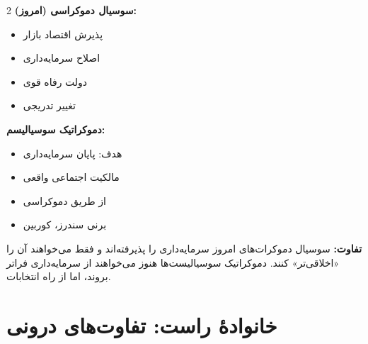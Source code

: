 \begin{tcolorbox}[
    enhanced,
    colback=centergreen!10,
    colframe=centergreen,
    boxrule=1.5pt,
    arc=5pt,
    fonttitle=\bfseries,
    title={\rl{🟢 سوسیال دموکراسی در برابر دموکراتیک سوسیالیسم}}
]
\begin{multicols}{2}
\textbf{سوسیال دموکراسی (امروز):}
\begin{itemize}
    \item پذیرش اقتصاد بازار
    \item اصلاح سرمایه‌داری
    \item دولت رفاه قوی
    \item تغییر تدریجی
\end{itemize}

\columnbreak

\textbf{دموکراتیک سوسیالیسم:}
\begin{itemize}
    \item هدف: پایان سرمایه‌داری
    \item مالکیت اجتماعی واقعی
    \item از طریق دموکراسی
    \item برنی سندرز، کوربین
\end{itemize}
\end{multicols}

\textbf{تفاوت:} سوسیال دموکرات‌های امروز سرمایه‌داری را پذیرفته‌اند و فقط می‌خواهند آن را «اخلاقی‌تر» کنند. دموکراتیک سوسیالیست‌ها هنوز می‌خواهند از سرمایه‌داری فراتر بروند، اما از راه انتخابات.
\end{tcolorbox}

\section*{خانوادهٔ راست: تفاوت‌های درونی}

